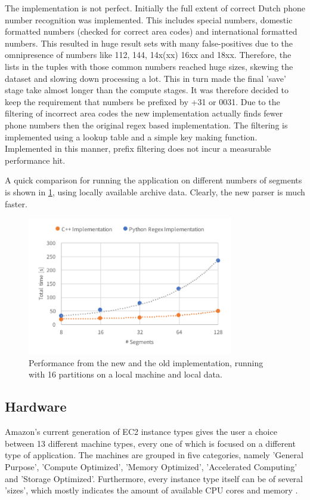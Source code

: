 \documentclass{article}
\begin{document}
The implementation is not perfect.
Initially the full extent of correct Dutch phone number recognition was implemented.
This includes special numbers, domestic formatted numbers (checked for correct area codes) and international formatted numbers.
This resulted in huge result sets with many false-positives due to the omnipresence of numbers like 112, 144, 14x(xx) 16xx and 18xx.
Therefore, the lists in the tuples with those common numbers reached huge sizes, skewing the dataset and slowing down processing a lot.
This in turn made the final 'save' stage take almost longer than the compute stages.
It was therefore decided to keep the requirement that numbers be prefixed by +31 or 0031.
Due to the filtering of incorrect area codes the new implementation actually finds fewer phone numbers then the original regex based implementation.
The filtering is implemented using a lookup table and a simple key making function.
Implemented in this manner, prefix filtering does not incur a measurable performance hit.

A quick comparison for running the application on different numbers of segments is shown in \cref{fig:impl-scaling}, using locally available archive data. Clearly, the new parser is much faster.

\begin{figure}[H]
    \centering
    \includegraphics[width=0.8\textwidth]{resource/impl-scaling.pdf}
    \caption{Performance from the new and the old implementation, running with 16 partitions on a local machine and local data.}
    \label{fig:impl-scaling}
\end{figure}

\subsection{Hardware}
Amazon's current generation of EC2 instance types gives the user a choice between 13 different machine types, every one of which is focused on a different type of application.
The machines are grouped in five categories, namely 'General Purpose', 'Compute Optimized', 'Memory Optimized', 'Accelerated Computing' and 'Storage Optimized'.
Furthermore, every instance type itself can be of several 'sizes', which mostly indicates the amount of available CPU cores and memory \cite{amazon2017instance}.
\end{document}
